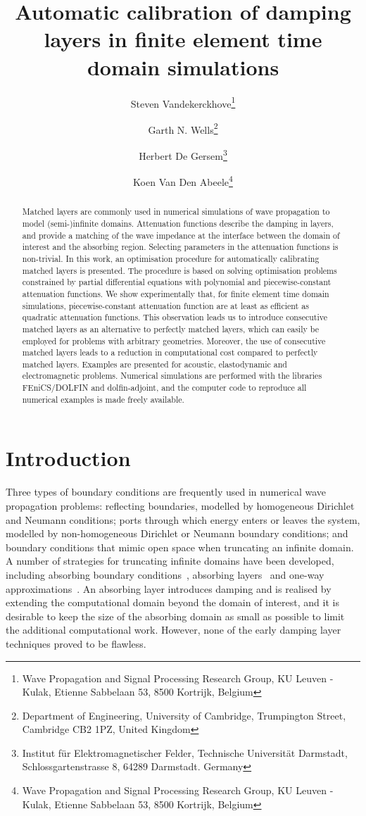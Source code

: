 \documentclass[a4paper]{article}
\title{\bf Automatic calibration of damping layers in finite element time
  domain simulations}
\author{Steven Vandekerckhove\thanks{Wave Propagation and Signal Processing
    Research Group, KU Leuven - Kulak, Etienne Sabbelaan 53, 8500 Kortrijk,
    Belgium}
    \and Garth N. Wells\thanks{Department of Engineering, University of
      Cambridge, Trumpington Street, Cambridge CB2 1PZ, United Kingdom}
    \and Herbert De Gersem\thanks{Institut f\"ur Elektromagnetischer Felder,
      Technische Universit\"at Darmstadt, Schlossgartenstrasse 8,
      64289 Darmstadt. Germany}
    \and Koen Van Den Abeele\thanks{Wave Propagation and Signal Processing
      Research Group, KU Leuven - Kulak, Etienne Sabbelaan 53, 8500 Kortrijk,
      Belgium}}
\date{}
\begin{document}
\maketitle

\begin{abstract}
  \noindent Matched layers are commonly used in numerical simulations
  of wave propagation to model (semi-)infinite domains.  Attenuation
  functions describe the damping in layers, and provide a matching of
  the wave impedance at the interface between the domain of interest
  and the absorbing region. Selecting parameters in the attenuation
  functions is non-trivial. In this work, an optimisation procedure
  for automatically calibrating matched layers is presented. The
  procedure is based on solving optimisation problems constrained by
  partial differential equations with polynomial and
  piecewise-constant attenuation functions. We show experimentally
  that, for finite element time domain simulations, piecewise-constant
  attenuation function are at least as efficient as quadratic
  attenuation functions. This observation leads us to introduce
  consecutive matched layers as an alternative to perfectly matched
  layers, which can easily be employed for problems with arbitrary
  geometries. Moreover, the use of consecutive matched layers leads to
  a reduction in computational cost compared to perfectly matched
  layers.  Examples are presented for acoustic, elastodynamic and
  electromagnetic problems.  Numerical simulations are performed with
  the libraries FEniCS/DOLFIN and dolfin-adjoint, and the computer
  code to reproduce all numerical examples is made freely available.
\end{abstract}

\maketitle
\section{Introduction}

Three types of boundary conditions are frequently used in numerical
wave propagation problems: reflecting boundaries, modelled by
homogeneous Dirichlet and Neumann conditions; ports through which
energy enters or leaves the system, modelled by non-homogeneous
Dirichlet or Neumann boundary conditions; and boundary conditions that
mimic open space when truncating an infinite domain. A number of
strategies for truncating infinite domains have been developed,
including absorbing boundary conditions~\citep{hagstrom99,
  peterson88}, absorbing layers~\citep{holland83williams, katz76etall}
and one-way approximations~\citep{engquist77majda, mur81}.  An
absorbing layer introduces damping and is realised by extending the
computational domain beyond the domain of interest, and it is
desirable to keep the size of the absorbing domain as small as
possible to limit the additional computational work.  However, none of
the early damping layer techniques proved to be flawless.
\end{document}
